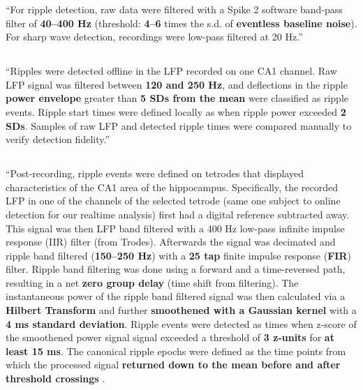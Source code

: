 ``For ripple detection, raw data were filtered with a Spike 2 software band-pass filter of \textbf{40--400 Hz} (threshold: \textbf{4--6} times the s.d. of \textbf{eventless baseline noise}). For sharp wave detection, recordings were low-pass filtered at 20 Hz.'' \cite{Behrens2005}


\subsection{}

``Ripples were detected offline in the LFP recorded on one CA1 channel. Raw LFP signal was filtered between \textbf{120 and 250 Hz}, and deflections in the ripple \textbf{power envelope} greater than \textbf{5 SDs from the mean} were classified as ripple events. Ripple start times were defined locally as when ripple power exceeded \textbf{2 SDs}. Samples of raw LFP and detected ripple times were compared manually to verify detection fidelity.'' \cite{Sadowski2016}


\subsection{}

``Post-recording, ripple events were defined on tetrodes that displayed characteristics of the CA1 area of the hippocampus. Specifically, the recorded LFP in one of the channels of the selected tetrode (same one subject to online detection for our realtime analysis) first had a digital reference subtracted away. This signal was then LFP band filtered with a 400 Hz low-pass infinite impulse response (IIR) filter (from Trodes). Afterwards the signal was decimated and ripple band filtered (\textbf{150–250 Hz}) with a \textbf{25 tap} finite impulse response (\textbf{FIR}) filter. Ripple band filtering was done using a forward and a time-reversed path, resulting in a net \textbf{zero group delay} (time shift from filtering). The instantaneous power of the ripple band filtered signal was then calculated via a \textbf{Hilbert Transform} and further \textbf{smoothened with a Gaussian kernel} with a \textbf{4 ms standard deviation}. Ripple events were detected as times when z-score of the smoothened power signal signal exceeded a threshold of \textbf{3 z-units} for \textbf{at least 15 ms}. The canonical ripple epochs were defined as the time points from which the processed signal \textbf{returned down to the mean before and after threshold crossings} \cite{Cheng2008,Kemere2013}.


